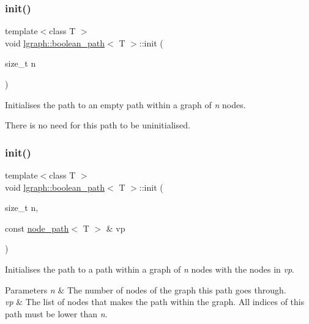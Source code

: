 \subsubsection{\texorpdfstring{init()}{init()}\hspace{0.1cm}{\footnotesize\ttfamily [1/2]}}
{\footnotesize\ttfamily template$<$class T $>$ \\
void \hyperlink{classlgraph_1_1boolean__path}{lgraph\+::boolean\+\_\+path}$<$ T $>$\+::init (\begin{DoxyParamCaption}\item[{size\+\_\+t}]{n }\end{DoxyParamCaption})}



Initialises the path to an empty path within a graph of {\itshape n} nodes. 

There is no need for this path to be \textquotesingle{}uninitialised\textquotesingle{}. \mbox{\label{classlgraph_1_1boolean__path_a01a381ba89ec44c10b7e6da16343ceac}} 
\subsubsection{\texorpdfstring{init()}{init()}\hspace{0.1cm}{\footnotesize\ttfamily [2/2]}}
{\footnotesize\ttfamily template$<$class T $>$ \\
void \hyperlink{classlgraph_1_1boolean__path}{lgraph\+::boolean\+\_\+path}$<$ T $>$\+::init (\begin{DoxyParamCaption}\item[{size\+\_\+t}]{n,  }\item[{const \hyperlink{classlgraph_1_1node__path}{node\+\_\+path}$<$ T $>$ \&}]{vp }\end{DoxyParamCaption})}



Initialises the path to a path within a graph of {\itshape n} nodes with the nodes in {\itshape vp}. 


\begin{DoxyParams}{Parameters}
{\em n} & The number of nodes of the graph this path goes through. \\
\hline
{\em vp} & The list of nodes that makes the path within the graph. All indices of this path must be lower than {\itshape n}. \\
\hline
\end{DoxyParams}
\mbox{\label{classlgraph_1_1boolean__path_a72f36b5460f82b2922cec385db08c967}} 
